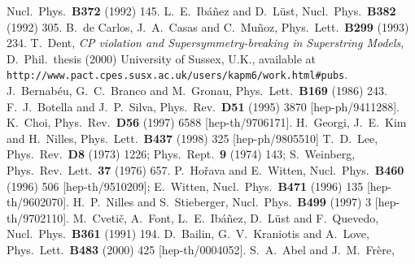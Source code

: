 \documentclass[a4paper,12pt]{article}
\begin{document}
\begin{thebibliography}{99}
	Nucl.\ Phys.\ {\bf B372} (1992) 145.
	L.~E.~Ib\'a\~nez and D.~L\"ust,
	Nucl.\ Phys.\ {\bf B382} (1992) 305.
	B.~de Carlos, J.~A.~Casas and C.~Mu\~noz,
	Phys.\ Lett.\ {\bf B299} (1993) 234.
	T.~Dent, {\em CP violation and Supersymmetry-breaking in Superstring Models}\/, D.~Phil.\ thesis (2000) University of Sussex, U.K., available at \mbox{\tt http://www.pact.cpes.susx.ac.uk/users/kapm6/work.html\#pubs}.
	J.~Bernab\'eu, G.~C.~Branco and M.~Gronau,
	Phys.\ Lett.\ {\bf B169} (1986) 243.
	F.~J.~Botella and J.~P.~Silva,
	Phys.\ Rev.\ {\bf D51} (1995) 3870 [hep-ph/9411288].
	K.~Choi,
	Phys.\ Rev.\ {\bf D56} (1997) 6588 [hep-th/9706171].
	H.~Georgi, J.~E.~Kim and H.~Nilles,
	Phys.\ Lett.\ {\bf B437} (1998) 325 [hep-ph/9805510]
	T.~D.~Lee,
	Phys.\ Rev.\ {\bf D8} (1973) 1226;
	Phys.\ Rept.\ {\bf 9} (1974) 143;
	S.~Weinberg,
	Phys.\ Rev.\ Lett.\ {\bf 37} (1976) 657.
	P.~Ho\v rava and E.~Witten,
	Nucl.\ Phys.\ {\bf B460} (1996) 506 [hep-th/9510209];
	E.~Witten,
	Nucl.\ Phys.\ {\bf B471} (1996) 135 [hep-th/9602070].
	H.~P.~Nilles and S.~Stieberger,
	Nucl.\ Phys.\ {\bf B499} (1997) 3 [hep-th/9702110].
	M.~Cveti\v c, A.~Font, L.~E.~Ib\'a\~nez, D.~L\"ust and F.~Quevedo,
	Nucl.\ Phys.\ {\bf B361} (1991) 194.
	D.~Bailin, G.~V.~Kraniotis and A.~Love,
	Phys.\ Lett.\ {\bf B483} (2000) 425 [hep-th/0004052].
	S.~A.~Abel and J.~M.~Fr\`ere,

\end{thebibliography}
\end{document}
